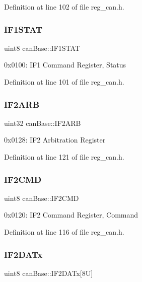 Definition at line 102 of file reg\+\_\+can.\+h.

\mbox{\label{structcanBase_aca914dba14cd06680760252b74fc94c5}} 
\subsubsection{\texorpdfstring{I\+F1\+S\+T\+AT}{IF1STAT}}
{\footnotesize\ttfamily uint8 can\+Base\+::\+I\+F1\+S\+T\+AT}

0x0100\+: I\+F1 Command Register, Status 

Definition at line 101 of file reg\+\_\+can.\+h.

\mbox{\label{structcanBase_a4bd471bc265d48426c61c65e2fd039cf}} 
\subsubsection{\texorpdfstring{I\+F2\+A\+RB}{IF2ARB}}
{\footnotesize\ttfamily uint32 can\+Base\+::\+I\+F2\+A\+RB}

0x0128\+: I\+F2 Arbitration Register 

Definition at line 121 of file reg\+\_\+can.\+h.

\mbox{\label{structcanBase_a258a11bb58abe1f6b01798425094f3ec}} 
\subsubsection{\texorpdfstring{I\+F2\+C\+MD}{IF2CMD}}
{\footnotesize\ttfamily uint8 can\+Base\+::\+I\+F2\+C\+MD}

0x0120\+: I\+F2 Command Register, Command 

Definition at line 116 of file reg\+\_\+can.\+h.

\mbox{\label{structcanBase_a143324ec98550cb67a4f4142423b0633}} 
\subsubsection{\texorpdfstring{I\+F2\+D\+A\+Tx}{IF2DATx}}
{\footnotesize\ttfamily uint8 can\+Base\+::\+I\+F2\+D\+A\+Tx\mbox{[}8\+U\mbox{]}}

